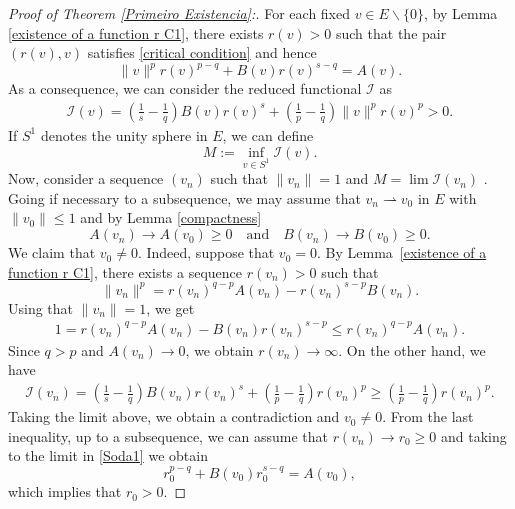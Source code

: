 \documentclass[12pt,reqno]{amsart}
\begin{document}
\begin{proof}[Proof of Theorem \ref{Primeiro Existencia}:] 
	For each fixed $v \in E\backslash\{0\}$, by Lemma \ref{existence of a function r C1}, there exists $r(v)>0$ such that the pair $(r(v),v)$ satisfies \eqref{critical condition} and hence 
 \begin{equation}%
     \|v\|^pr(v)^{p-q}+B(v)r(v)^{s-q}=A(v).
 \end{equation}
As a consequence, we can consider the reduced functional $\mathcal{I}$ as
	\begin{align*}
		\mathcal{I}(v)
		= \left(\frac{1}{s}-\frac{1}{q}\right)B(v)r(v)^s+\left(\frac{1}{p}-\frac{1}{q}\right)\|v\|^pr(v)^p>0.
	\end{align*}
If $S^1$ denotes the unity sphere in $E$, we can define 
$$
 M:=\inf_{v\in S^1}\mathcal{I}(v).  
$$
Now, consider a sequence $(v_n)$ such that $\|v_n\|=1$ and $M=\lim\mathcal{I}(v_n)$ . Going if necessary to a subsequence, we may assume that  $v_n \rightharpoonup v_0$ in $E$ with $\|v_0\|\leq 1$ and by Lemma \ref{compactness} 
	\begin{equation*}
		A(v_n)\rightarrow A(v_0)\geq 0\quad\text{and}\quad B(v_n)\rightarrow B(v_0)\geq 0.
	\end{equation*}
We claim that $v_0 \neq 0$. Indeed, suppose that $v_0=0$. By  Lemma~\ref{existence of a function r C1}, there exists a sequence $r(v_n)>0$ such that
 \begin{equation}\label{Soda1}
     \|v_n\|^p=r(v_n)^{q-p}A(v_n)-r(v_n)^{s-p}B(v_n).
  \end{equation}
 Using that  $\|v_n\|=1$, we get
		\begin{align*}
		1=r(v_n)^{q-p}A(v_n)-B(v_n)r(v_n)^{s-p}
		\leq r(v_n)^{q-p}A(v_n).
	\end{align*}
Since $q>p$ and $A(v_n)\rightarrow0$, we obtain   $r(v_n)\rightarrow \infty$. On the other hand, we have
	\begin{align*}
		\mathcal{I}(v_n)=\left(\frac{1}{s}-\frac{1}{q}\right)B(v_n)r(v_n)^s+\left(\frac{1}{p}-\frac{1}{q}\right)r(v_n)^p
		\geq \left(\frac{1}{p}-\frac{1}{q}\right)r(v_n)^p.
	\end{align*}
Taking the limit above, we obtain a contradiction and $v_0\neq 0$. From the last inequality, up to a subsequence, we can assume that $r(v_n)\rightarrow r_0\geq0$ and taking to the limit in \eqref{Soda1} we obtain 	\begin{equation}\label{Zico}
		r_0^{p-q}+B(v_0)r_0^{s-q}=A(v_0),
	\end{equation}
which implies that $r_0>0$.	


\end{proof}
\end{document}
